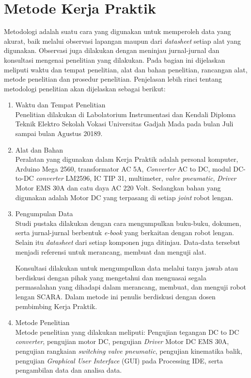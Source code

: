 \section{Metode Kerja Praktik}
Metodologi adalah suatu cara yang digunakan untuk memperoleh data yang akurat, baik melalui observasi lapangan maupun dari \emph {datasheet} setiap alat yang digunakan. Observasi juga dilakukan dengan meninjau jurnal-jurnal dan konsultasi mengenai penelitian yang dilakukan. Pada bagian ini dijelaskan meliputi waktu dan tempat penelitian, alat dan bahan penelitian, rancangan alat, metode penelitian dan prosedur penelitian. Penjelasan lebih rinci tentang metodologi penelitian akan dijelaskan sebagai berikut: 

\begin{enumerate}
	\item Waktu dan Tempat Penelitian \\
	Penelitian dilakukan di Labolatorium Instrumentasi dan Kendali Diploma Teknik Elektro Sekolah Vokasi Universitas Gadjah Mada pada bulan Juli sampai bulan Agustus 20189.
	
	\item Alat dan Bahan \\
	Peralatan yang digunakan dalam Kerja Praktik adalah personal komputer, Arduino Mega 2560, transformator AC 5A, \textit{Converter} AC to DC, modul DC-to-DC \textit{converter} LM2596, IC TIP 31, multimeter,\textit{ valve pneumatic}, \textit{Driver} Motor EMS 30A dan catu daya AC 220 Volt. Sedangkan bahan yang digunakan adalah Motor DC yang terpasang di setiap \emph {joint} robot lengan.
	
	\item  Pengumpulan Data \\
	Studi pustaka dilakukan dengan cara mengumpulkan buku-buku, dokumen, serta jurnal-jurnal berbentuk \emph{e-book} yang berkaitan dengan robot lengan. Selain itu \emph{datasheet} dari setiap komponen juga ditinjau. Data-data tersebut menjadi referensi untuk merancang, membuat dan menguji alat. 
	
	Konsultasi dilakukan untuk mengumpulkan data melalui tanya jawab atau berdiskusi dengan pihak yang mengetahui dan menguasai segala permasalahan yang dihadapi dalam merancang, membuat, dan menguji robot lengan SCARA. Dalam metode ini penulis berdiskusi dengan dosen pembimbing Kerja Praktik. 
	
	\item Metode Penelitian \\
	Metode penelitian yang dilakukan meliputi: Pengujian tegangan DC to DC \textit{converter}, pengujian motor DC, pengujian \textit{Driver} Motor DC EMS 30A, pengujian rangkaian \textit{switching valve pneumatic}, pengujian kinematika balik, pengujian \textit{Graphical User Interface} (GUI) pada Processing IDE, serta pengambilan data dan analisa data.
	

\end{enumerate}
